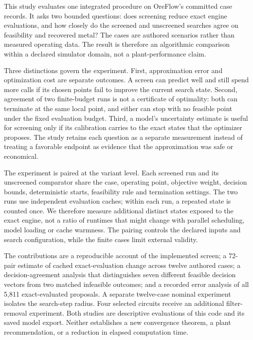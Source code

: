 \documentclass[10pt]{article}
\begin{document}
This study evaluates one integrated procedure on OreFlow's committed case records. It asks two bounded questions: does screening reduce exact engine evaluations, and how closely do the screened and unscreened searches agree on feasibility and recovered metal? The cases are authored scenarios rather than measured operating data. The result is therefore an algorithmic comparison within a declared simulator domain, not a plant-performance claim.

Three distinctions govern the experiment. First, approximation error and optimization cost are separate outcomes. A screen can predict well and still spend more calls if its chosen points fail to improve the current search state. Second, agreement of two finite-budget runs is not a certificate of optimality: both can terminate at the same local point, and either can stop with no feasible point under the fixed evaluation budget. Third, a model's uncertainty estimate is useful for screening only if its calibration carries to the exact states that the optimizer proposes. The study retains each question as a separate measurement instead of treating a favorable endpoint as evidence that the approximation was safe or economical.

The experiment is paired at the variant level. Each screened run and its unscreened comparator share the case, operating point, objective weight, decision bounds, deterministic starts, feasibility rule and termination settings. The two runs use independent evaluation caches; within each run, a repeated state is counted once. We therefore measure additional distinct states exposed to the exact engine, not a ratio of runtimes that might change with parallel scheduling, model loading or cache warmness. The pairing controls the declared inputs and search configuration, while the finite cases limit external validity.

The contributions are a reproducible account of the implemented screen; a 72-pair estimate of cached exact-evaluation change across twelve authored cases; a decision-agreement analysis that distinguishes seven different feasible decision vectors from two matched infeasible outcomes; and a recorded error analysis of all 5,811 exact-evaluated proposals. A separate twelve-case nominal experiment isolates the search-step radius. Four selected circuits receive an additional filter-removal experiment. Both studies are descriptive evaluations of this code and its saved model export. Neither establishes a new convergence theorem, a plant recommendation, or a reduction in elapsed computation time.
\end{document}
